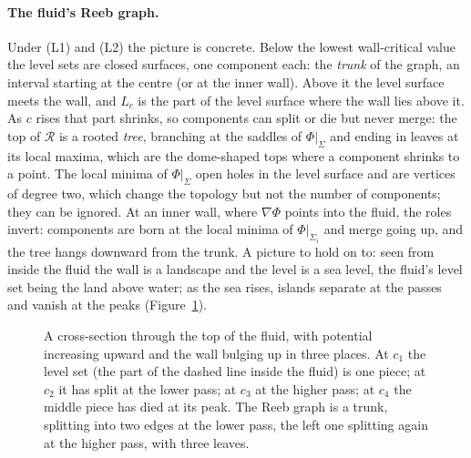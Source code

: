 \documentclass[11pt]{article}
\theoremstyle{definition}
\theoremstyle{remark}
\begin{document}
\paragraph{The fluid's Reeb graph.} Under (L1) and (L2) the picture
is concrete. Below the lowest wall-critical value the level sets are
closed surfaces, one component each: the \emph{trunk} of the graph,
an interval starting at the centre (or at the inner wall). Above it
the level surface meets the wall, and $L_c$ is the part of the level
surface where the wall lies above it. As $c$ rises that part shrinks,
so components can split or die but never merge: the top of $\mathcal
R$ is a rooted \emph{tree}, branching at the saddles of $\Phi|_\Sigma$
and ending in leaves at its local maxima, which are the dome-shaped
tops where a component shrinks to a point. The local minima of
$\Phi|_\Sigma$ open holes in the level surface and are vertices of
degree two, which change the topology but not the number of
components; they can be ignored. At an inner wall, where $\nabla\Phi$
points into the fluid, the roles invert: components are born at the
local minima of $\Phi|_{\Sigma_i}$ and merge going up, and the tree
hangs downward from the trunk. A picture to hold on to: seen from
inside the fluid the wall is a landscape and the level is a sea level,
the fluid's level set being the land above water; as the sea rises,
islands separate at the passes and vanish at the peaks
(Figure~\ref{fig:reeb}).

\begin{figure}[htbp]
\centering
{}
\caption{A cross-section through the top of the fluid, with potential
increasing upward and the wall bulging up in three places. At $c_1$ the level set (the part of the
dashed line inside the fluid) is one piece; at $c_2$ it has split at
the lower pass; at $c_3$ at the higher pass; at $c_4$ the middle piece
has died at its peak. The Reeb graph is a trunk, splitting into two
edges at the lower pass, the left one splitting again at the higher
pass, with three leaves.}
\label{fig:reeb}
\end{figure}
\end{document}
